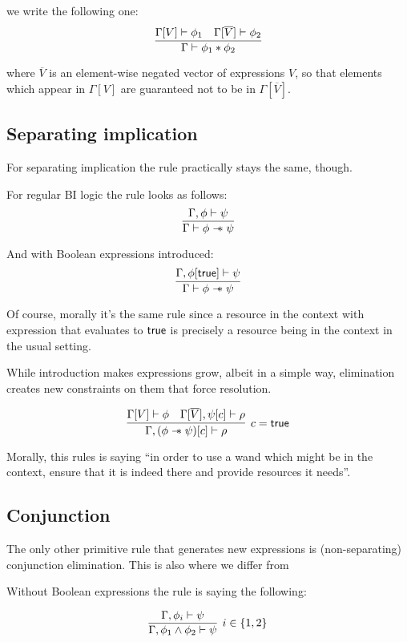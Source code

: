 {we write the following one:
\[\infer{\Gamma \vdash \phi_1 \ast \phi_2}
      {\Gamma[V] \vdash \phi_1 &
       \Gamma[\overline{V}] \vdash \phi_2}\]

where \(\overline{V}\) is an element-wise negated vector of expressions \(V\), so
that elements which appear in \(\Gamma[V]\) are guaranteed not to be in \(\Gamma[\overline{V}]\).

\subsection{Separating implication}

For separating implication the rule practically stays the same, though.

For regular BI logic the rule looks as follows:
\[
\infer{\Gamma \vdash \phi \wand \psi}
      {\Gamma , \phi \vdash \psi}
\]

And with Boolean expressions introduced:
\[
\infer{\Gamma \vdash \phi \wand \psi}
      {\Gamma , \phi[\true] \vdash \psi}
\]

Of course, morally it's the same rule since a resource in the context with expression that evaluates to \(\textsf{true}\) is precisely a resource being in the context in the usual setting.

While introduction makes expressions grow, albeit in a simple way, elimination creates new constraints on them that force resolution.

\[
\infer[ c = \true ]
      {\Gamma, (\phi \wand \psi)[c] \vdash \rho}
      {\Gamma[V] \vdash \phi &
       \Gamma[\overline{V}], \psi[c] \vdash \rho}
\]

Morally, this rules is saying ``in order to use a wand which might be in the context, ensure that it is indeed there and provide resources it needs''.

\subsection{Conjunction}

The only other primitive rule that generates new expressions is (non-separating) conjunction elimination.
This is also where we differ from \citet{harlandResourceDistributionBooleanConstraints2003}

Without Boolean expressions the rule is saying the following:

\[
\infer[ i \in \{1,2\} ]
      {\Gamma, \phi_1 \wedge \phi_2 \vdash \psi}
      {\Gamma, \phi_i \vdash \psi}
\]

}
